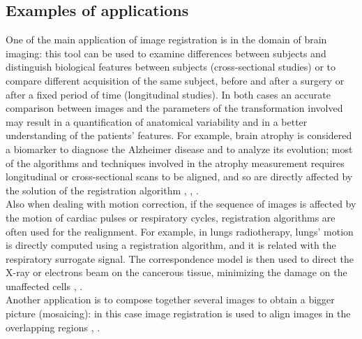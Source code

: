 \subsection{Examples of applications}
One of the main application of image registration is in the domain of brain imaging: this tool can be used to examine differences between subjects and distinguish biological features between subjects (cross-sectional studies) or to compare different acquisition of the same subject, before and after a surgery or after a fixed period of time (longitudinal studies). 
In both cases an accurate comparison between images and the parameters of the transformation involved may result in a quantification of anatomical variability and in a better understanding of the patients' features. 
%
For example, brain atrophy is considered a biomarker to diagnose the Alzheimer disease and to analyze its evolution; most of the algorithms and techniques involved in the atrophy measurement requires longitudinal or cross-sectional scans to be aligned, and so are directly affected by the solution of the registration algorithm \cite{fox1997brain}, \cite{gauthier2012prevention}, \cite{prados2015measuring}. \\
Also when dealing with motion correction, if the sequence of images is affected by the motion of cardiac pulses or respiratory cycles, registration algorithms are often used for the realignment. 
For example, in lungs radiotherapy, lungs' motion is directly computed using a registration algorithm, and it is related with the respiratory surrogate signal. The correspondence model is then used to direct the X-ray or electrons beam on the cancerous tissue, minimizing the damage on the unaffected cells \cite{mcclelland}, \cite{mcclelland2011inter}.\\
Another application is to compose together several images to obtain a bigger picture (mosaicing): in this case image registration is used to align images in the overlapping regions \cite{vercauteren2006robust}, \cite{szeliski1994image}.

